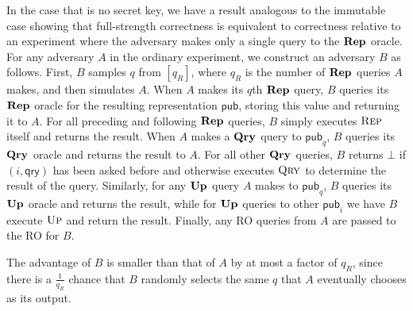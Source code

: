 In the case that is no secret key, we have a result analogous to the immutable case showing that full-strength correctness is equivalent to correctness relative to an experiment where the adversary makes only a single query to the $\mathbf{Rep}\hspace{0.5pt}$ oracle.  For any adversary $A$ in the ordinary experiment, we construct an adversary $B$ as follows. First, $B$ samples $q$ from $[q_R]$, where $q_R$ is the number of $\mathbf{Rep}\hspace{0.5pt}$ queries $A$ makes, and then simulates $A$. When $A$ makes its $q$th $\mathbf{Rep}\hspace{0.5pt}$ query, $B$ queries its $\mathbf{Rep}\hspace{0.5pt}$ oracle for the resulting representation $\mathsf{pub}$, storing this value and returning it to $A$. For all preceding and following $\mathbf{Rep}\hspace{0.5pt}$ queries, $B$ simply executes $\textsc{Rep}$ itself and returns the result. When $A$ makes a $\mathbf{Qry}\hspace{0.5pt}$ query to $\mathsf{pub}_q$, $B$ queries its $\mathbf{Qry}\hspace{0.5pt}$ oracle and returns the result to $A$. For all other $\mathbf{Qry}\hspace{0.5pt}$ queries, $B$ returns $\bot$ if $(i,\mathsf{qry})$ has been asked before and otherwise executes $\textsc{Qry}$ to determine the result of the query. Similarly, for any $\mathbf{Up}\hspace{0.5pt}$ query $A$ makes to $\mathsf{pub}_q$, $B$ queries its $\mathbf{Up}\hspace{0.5pt}$ oracle and returns the result, while for $\mathbf{Up}\hspace{0.5pt}$ queries to other $\mathsf{pub}_i$ we have $B$ execute $\textsc{Up}$ and return the result. Finally, any RO queries from $A$ are passed to the RO for $B$.

The advantage of $B$ is smaller than that of $A$ by at most a factor of $q_R$, since there is a $\frac{1}{q_R}$ chance that $B$ randomly selects the same $q$ that $A$ eventually chooses as its output.

